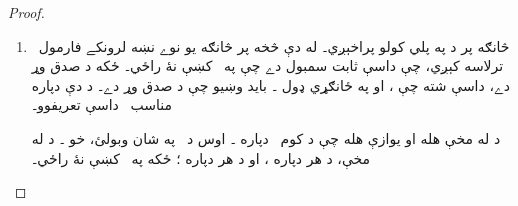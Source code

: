\documentclass[12pt,a4paper,oneside]{report}
\theoremstyle{definition}
\begin{document}
\begin{proof}
\begin{enumerate}
\label{olpseg:OLP-0109-B016:start}
\item څانګه پر \LR{$\sFmla{\False}{\lforall[x][!A(x)]} \in \Gamma$} د
  \LR{$\TRule{\False}{\lforall}$} په پلي کولو پراخېږي۔ له دې څخه پر
  څانګه يو نوے نښه لرونکے فارمول~ ترلاسه
  کېږي، چې  داسې ثابت سمبول دے چې په~\LR{$\Gamma$} کښې نۀ راځي۔
  ځکه \LR{$\Gamma$} د صدق وړ دے، داسې  شته چې
  ، او په ځانګړي ډول
  ۔ بايد وښيو چې
   د صدق وړ دے۔ د دې دپاره
  مناسب~ داسې تعريفوو۔
\label{olpseg:OLP-0109-B016:end}

\label{olpseg:OLP-0109-B017:start}
د  له مخې
   هله او يوازې هله چې د کوم~
  دپاره ۔ اوس  د~ په
  شان وبولئ، خو ۔ د
   له مخې، د هر
   دپاره ، او د هر
   دپاره ؛ ځکه
   په~\LR{$\Gamma$} کښې نۀ راځي۔
\label{olpseg:OLP-0109-B017:end}


\end{enumerate}
\end{proof}
\end{document}
